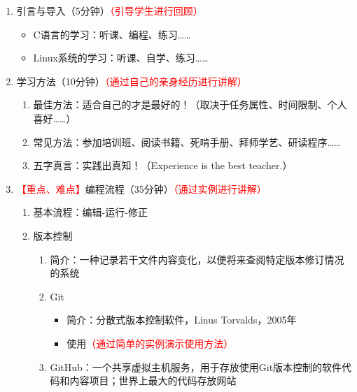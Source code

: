 \documentclass{TIJMUjiaoanLL}
\begin{document}
\begin{enumerate}
  \item 引言与导入（5分钟）\textcolor{red}{（引导学生进行回顾）}
    \begin{itemize}
      \item C语言的学习：听课、编程、练习……
      \item Linux系统的学习：听课、自学、练习……
    \end{itemize}
  \item 学习方法（10分钟）\textcolor{red}{（通过自己的亲身经历进行讲解）}
    \begin{enumerate}
      \item 最佳方法：适合自己的才是最好的！（取决于任务属性、时间限制、个人喜好……）
      \item 常见方法：参加培训班、阅读书籍、死啃手册、拜师学艺、研读程序……
      \item 五字真言：实践出真知！（Experience is the best teacher.）
    \end{enumerate}
  \item \textcolor{red}{【重点、难点】}编程流程（35分钟）\textcolor{red}{（通过实例进行讲解）}
    \begin{enumerate}
      \item 基本流程：编辑-运行-修正
      \item 版本控制
	\begin{enumerate}
	  \item 简介：一种记录若干文件内容变化，以便将来查阅特定版本修订情况的系统
	  \item Git
	    \begin{itemize}
	      \item 简介：分散式版本控制软件，Linus Torvalds，2005年
	      \item 使用\textcolor{red}{（通过简单的实例演示使用方法）}
	    \end{itemize}
	  \item GitHub：一个共享虚拟主机服务，用于存放使用Git版本控制的软件代码和内容项目；世界上最大的代码存放网站
	\end{enumerate}
\vspace*{-1em}
\end{enumerate}
\end{enumerate}
\end{document}
